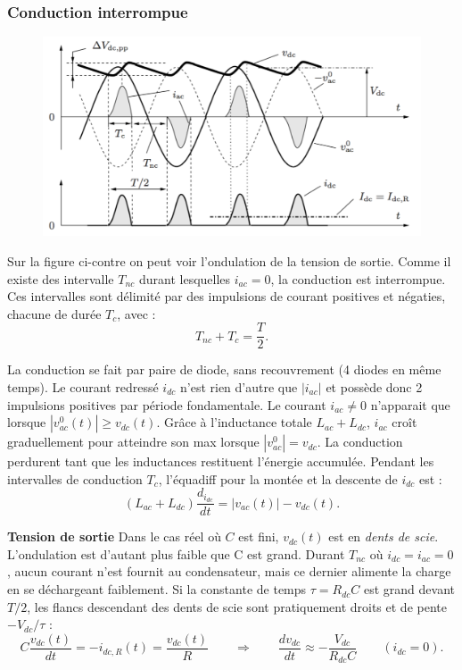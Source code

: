 		\subsubsection{Conduction interrompue}
			\begin{figure}
			\vspace{-5mm}
			\includegraphics[scale=0.3]{ch2/15}
			\end{figure} 
			Sur la figure ci-contre on peut voir l'ondulation de la tension de sortie. Comme il existe des intervalle $T_{nc}$	durant lesquelles $i_{ac} = 0$, la conduction est interrompue. Ces intervalles sont délimité par des impulsions de courant positives et négaties, chacune de durée $T_{c}$, avec :
			\begin{equation}
				T_{nc} + T_c = \frac{T}{2}.
			\end{equation}
			
			La conduction se fait par paire de diode, sans recouvrement (4 diodes en même temps). Le courant redressé $i_{dc}$ n'est rien d'autre que $|i_{ac}|$ et possède donc 2 impulsions positives par période fondamentale. Le courant $i_{ac} \neq 0$ n'apparait que lorsque $|v_{ac}^0(t)| \geq v_{dc}(t)$. Grâce à l'inductance totale $L_{ac} + L_{dc}$, $i_{ac}$ croît graduellement pour atteindre son max lorsque $|v_{ac}^0| = v_{dc}$. La conduction perdurent tant que les inductances restituent l'énergie accumulée. Pendant les intervalles de conduction $T_c$, l'équadiff pour la montée et la descente de $i_{dc}$ est :
			\begin{equation}
				(L_{ac}+L_{dc})\frac{d_{i_{dc}}}{dt} = |v_{ac}(t)|-v_{dc}(t).
			\end{equation}
			
			\textbf{Tension de sortie} \qquad Dans le cas réel où $C$ est fini, $v_{dc}(t)$ est en \textit{dents de scie}. L'ondulation est d'autant plus faible que C est grand. Durant $T_{nc}$ où $i_{dc} =i_{ac} =0$, aucun courant n'est fournit au condensateur, mais ce dernier alimente la charge en se déchargeant faiblement. Si la constante de temps $\tau = R_{dc}C$ est grand devant $T/2$, les flancs descendant des dents de scie sont pratiquement droits et de pente $-V_{dc}/\tau$ : 
			\begin{equation}
				C\frac{v_{dc}(t)}{dt} = -i_{dc,R}(t) = \frac{v_{dc}(t)}{R} \qquad \Rightarrow \qquad \frac{dv_{dc}}{dt} \approx - \frac{V_{dc}}{R_{dc}C} \qquad (i_{dc} = 0).
			\end{equation}
			
